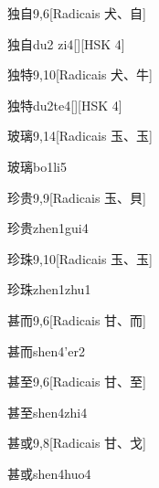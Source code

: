 \begin{entry}{独自}{9,6}[Radicais ⽝、⾃]
  \begin{phonetics}{独自}{du2 zi4}[][HSK 4]
  \end{phonetics}
\end{entry}

\begin{entry}{独特}{9,10}[Radicais ⽝、⽜]
  \begin{phonetics}{独特}{du2te4}[][HSK 4]
  \end{phonetics}
\end{entry}

\begin{entry}{玻璃}{9,14}[Radicais ⽟、⽟]
  \begin{phonetics}{玻璃}{bo1li5}
  \end{phonetics}
\end{entry}

\begin{entry}{珍贵}{9,9}[Radicais ⽟、⾙]
  \begin{phonetics}{珍贵}{zhen1gui4}
  \end{phonetics}
\end{entry}

\begin{entry}{珍珠}{9,10}[Radicais ⽟、⽟]
  \begin{phonetics}{珍珠}{zhen1zhu1}
  \end{phonetics}
\end{entry}

\begin{entry}{甚而}{9,6}[Radicais ⽢、⽽]
  \begin{phonetics}{甚而}{shen4'er2}
  \end{phonetics}
\end{entry}

\begin{entry}{甚至}{9,6}[Radicais ⽢、⾄]
  \begin{phonetics}{甚至}{shen4zhi4}
  \end{phonetics}
\end{entry}

\begin{entry}{甚或}{9,8}[Radicais ⽢、⼽]
  \begin{phonetics}{甚或}{shen4huo4}
  \end{phonetics}
\end{entry}

